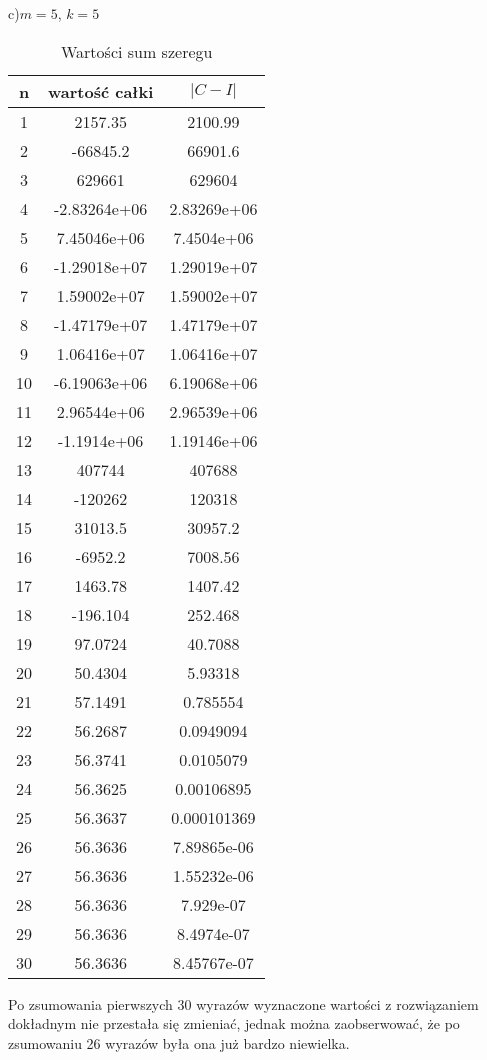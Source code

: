 \documentclass{article}
\begin{document}
\newpage
c)$m=5$, $k=5$
\begin{table}[H]
\centering
\begin{tabular}{|c|c|c|}
n& wartość całki & $|C−I|$ \\
\hline
1 & 2157.35 & 2100.99\\
2 & -66845.2 & 66901.6\\
3 & 629661 & 629604\\
4 & -2.83264e+06 & 2.83269e+06\\
5 & 7.45046e+06 & 7.4504e+06\\
6 & -1.29018e+07 & 1.29019e+07\\
7 & 1.59002e+07 & 1.59002e+07\\
8 & -1.47179e+07 & 1.47179e+07\\
9 & 1.06416e+07 & 1.06416e+07\\
10 & -6.19063e+06 & 6.19068e+06\\
11 & 2.96544e+06 & 2.96539e+06\\
12 & -1.1914e+06 & 1.19146e+06\\
13 & 407744 & 407688\\
14 & -120262 & 120318\\
15 & 31013.5 & 30957.2\\
16 & -6952.2 & 7008.56\\
17 & 1463.78 & 1407.42\\
18 & -196.104 & 252.468\\
19 & 97.0724 & 40.7088\\
20 & 50.4304 & 5.93318\\
21 & 57.1491 & 0.785554\\
22 & 56.2687 & 0.0949094\\
23 & 56.3741 & 0.0105079\\
24 & 56.3625 & 0.00106895\\
25 & 56.3637 & 0.000101369\\
26 & 56.3636 & 7.89865e-06\\
27 & 56.3636 & 1.55232e-06\\
28 & 56.3636 & 7.929e-07\\
29 & 56.3636 & 8.4974e-07\\
30 & 56.3636 & 8.45767e-07
\end{tabular}
\caption{Wartości sum szeregu}
\end{table}
Po zsumowania pierwszych 30 wyrazów wyznaczone wartości z rozwiązaniem dokładnym nie przestała
się zmieniać, jednak można zaobserwować, że po zsumowaniu 26 wyrazów była ona już bardzo niewielka. 
\end{document}
